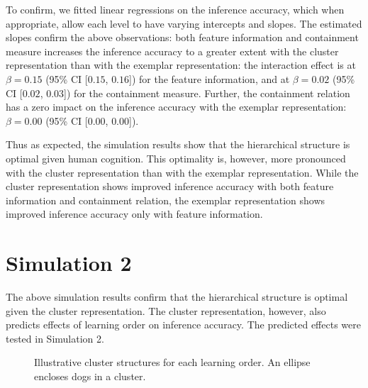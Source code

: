 \documentclass[doc]{apa6}
\begin{document}
To confirm, we fitted linear regressions on the inference accuracy, which when appropriate, allow
each level to have varying intercepts and slopes. The estimated slopes confirm the above
observations: both feature information and containment measure increases the inference accuracy to a
greater extent with the cluster representation than with the exemplar representation: the
interaction effect is at $\beta=0.15$ (95\% CI [$0.15$, $0.16$]) for the feature information, and at
$\beta=0.02$ (95\% CI [$0.02$, $0.03$]) for the containment measure. Further, the containment
relation has a zero impact on the inference accuracy with the exemplar representation: $\beta=0.00$
(95\% CI [$0.00$, $0.00$]).

Thus as expected, the simulation results show that the hierarchical structure is optimal given human
cognition. This optimality is, however, more pronounced with the cluster representation than with
the exemplar representation. While the cluster representation shows improved inference accuracy with
both feature information and containment relation, the exemplar representation shows improved
inference accuracy only with feature information.


\section*{Simulation 2}


The above simulation results confirm that the hierarchical structure is optimal given the cluster
representation. The cluster representation, however, also predicts effects of learning order on
inference accuracy. The predicted effects were tested in Simulation 2.

\begin{figure}
    \centering



    \vspace{10pt}

    \caption{Illustrative cluster structures for each learning order. An ellipse encloses dogs in a
    cluster.}

\label{fig:learning_order}
\end{figure}
\end{document}
